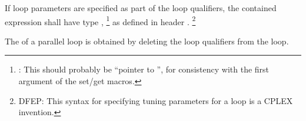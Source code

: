 \pnum
If loop parameters are specified as part of the loop qualifiers,
the contained expression shall have type
,%
\footnote{:
This should probably be
``pointer to '',
for consistency with the first argument of the set/get macros.
}
as defined in header
.%
\footnote{DFEP:
This syntax for specifying tuning parameters for a loop
is a CPLEX invention.
}

\pnum
The
of a parallel loop
is obtained by deleting the loop qualifiers from the loop.